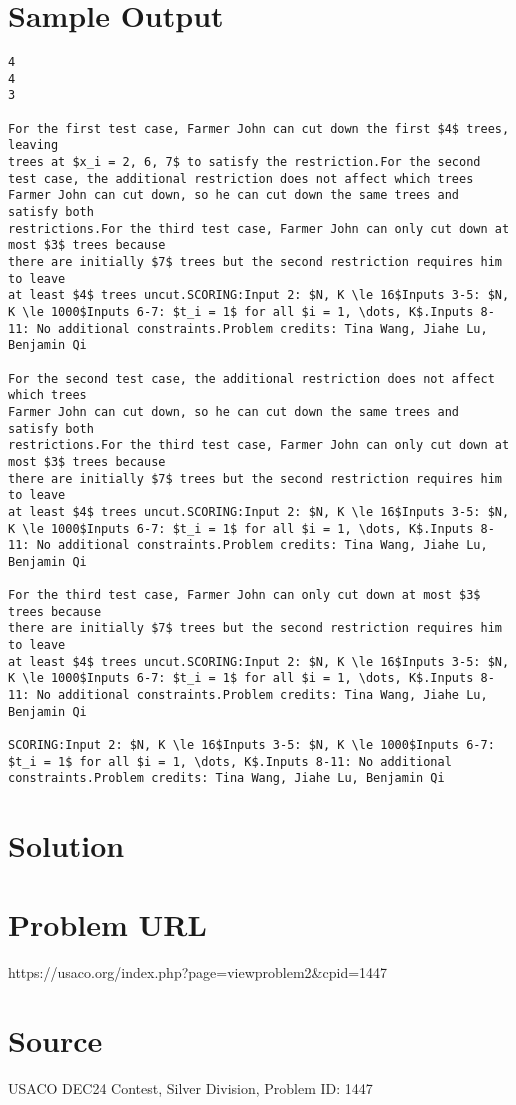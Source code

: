\documentclass[12pt]{article}
\begin{document}
\section*{Sample Output}
\begin{verbatim}
4
4
3

For the first test case, Farmer John can cut down the first $4$ trees, leaving
trees at $x_i = 2, 6, 7$ to satisfy the restriction.For the second test case, the additional restriction does not affect which trees
Farmer John can cut down, so he can cut down the same trees and satisfy both
restrictions.For the third test case, Farmer John can only cut down at most $3$ trees because
there are initially $7$ trees but the second restriction requires him to leave
at least $4$ trees uncut.SCORING:Input 2: $N, K \le 16$Inputs 3-5: $N, K \le 1000$Inputs 6-7: $t_i = 1$ for all $i = 1, \dots, K$.Inputs 8-11: No additional constraints.Problem credits: Tina Wang, Jiahe Lu, Benjamin Qi

For the second test case, the additional restriction does not affect which trees
Farmer John can cut down, so he can cut down the same trees and satisfy both
restrictions.For the third test case, Farmer John can only cut down at most $3$ trees because
there are initially $7$ trees but the second restriction requires him to leave
at least $4$ trees uncut.SCORING:Input 2: $N, K \le 16$Inputs 3-5: $N, K \le 1000$Inputs 6-7: $t_i = 1$ for all $i = 1, \dots, K$.Inputs 8-11: No additional constraints.Problem credits: Tina Wang, Jiahe Lu, Benjamin Qi

For the third test case, Farmer John can only cut down at most $3$ trees because
there are initially $7$ trees but the second restriction requires him to leave
at least $4$ trees uncut.SCORING:Input 2: $N, K \le 16$Inputs 3-5: $N, K \le 1000$Inputs 6-7: $t_i = 1$ for all $i = 1, \dots, K$.Inputs 8-11: No additional constraints.Problem credits: Tina Wang, Jiahe Lu, Benjamin Qi

SCORING:Input 2: $N, K \le 16$Inputs 3-5: $N, K \le 1000$Inputs 6-7: $t_i = 1$ for all $i = 1, \dots, K$.Inputs 8-11: No additional constraints.Problem credits: Tina Wang, Jiahe Lu, Benjamin Qi
\end{verbatim}

\section*{Solution}


\section*{Problem URL}
https://usaco.org/index.php?page=viewproblem2&cpid=1447

\section*{Source}
USACO DEC24 Contest, Silver Division, Problem ID: 1447
\end{document}
